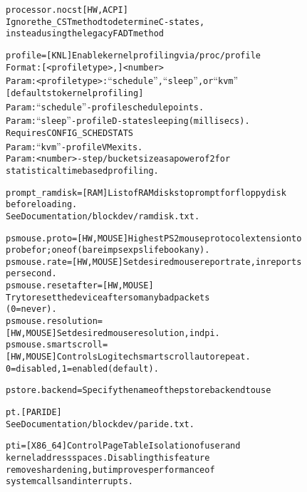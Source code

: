 \documentclass[a4paper,8pt,english]{sphinxmanual}
\begin{document}
\begin{alltt}
        processor.nocst {[}HW,ACPI{]}
                        Ignore the \_CST method to determine C-states,
                        instead using the legacy FADT method

        profile=        {[}KNL{]} Enable kernel profiling via /proc/profile
                        Format: {[}\textless{}profiletype\textgreater{},{]}\textless{}number\textgreater{}
                        Param: \textless{}profiletype\textgreater{}: ``schedule'', ``sleep'', or ``kvm''
                                {[}defaults to kernel profiling{]}
                        Param: ``schedule'' - profile schedule points.
                        Param: ``sleep'' - profile D-state sleeping (millisecs).
                                Requires CONFIG\_SCHEDSTATS
                        Param: ``kvm'' - profile VM exits.
                        Param: \textless{}number\textgreater{} - step/bucket size as a power of 2 for
                                statistical time based profiling.

        prompt\_ramdisk= {[}RAM{]} List of RAM disks to prompt for floppy disk
                        before loading.
                        See Documentation/blockdev/ramdisk.txt.

        psmouse.proto=  {[}HW,MOUSE{]} Highest PS2 mouse protocol extension to
                        probe for; one of (bare\textbar{}imps\textbar{}exps\textbar{}lifebook\textbar{}any).
        psmouse.rate=   {[}HW,MOUSE{]} Set desired mouse report rate, in reports
                        per second.
        psmouse.resetafter=     {[}HW,MOUSE{]}
                        Try to reset the device after so many bad packets
                        (0 = never).
        psmouse.resolution=
                        {[}HW,MOUSE{]} Set desired mouse resolution, in dpi.
        psmouse.smartscroll=
                        {[}HW,MOUSE{]} Controls Logitech smartscroll autorepeat.
                        0 = disabled, 1 = enabled (default).

        pstore.backend= Specify the name of the pstore backend to use

        pt.             {[}PARIDE{]}
                        See Documentation/blockdev/paride.txt.

        pti=            {[}X86\_64{]} Control Page Table Isolation of user and
                        kernel address spaces.  Disabling this feature
                        removes hardening, but improves performance of
                        system calls and interrupts.


\end{alltt}
\end{document}
